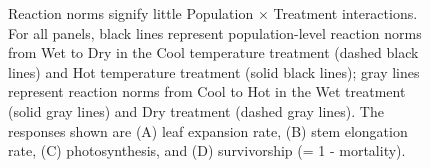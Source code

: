 \documentclass[11pt, oneside]{article}
\begin{document}
\begin{figure}
\begin{subfigure}{0.4\textwidth}
        \label{fig:FigS_MortRxnNorm}
    \end{subfigure}
\caption[Reaction norms]{Reaction norms signify little Population $\times$ Treatment interactions. For all panels, black lines represent population-level reaction norms from Wet to Dry in the Cool temperature treatment (dashed black lines) and Hot temperature treatment (solid black lines); gray lines represent reaction norms from Cool to Hot in the Wet treatment (solid gray lines) and Dry treatment (dashed gray lines). The responses shown are (A) leaf expansion rate, (B) stem elongation rate, (C) photosynthesis, and (D) survivorship (= 1 - mortality).}
	\label{fig:FigS_RxnNorms}
\end{figure}

\end{document}
